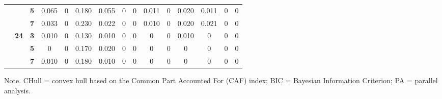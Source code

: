 \documentclass[a4paper,man,natbib]{apa6}
\begin{document}
\begin{table}[h]
\begin{center}
{\begin{tabular}{ccccccccccccccc}
		&
		&
		\textbf{5} &
		0.065 &
		0 &
		0.180 &
		0.055 &
		0 &
		0 &
		0.011 &
		0 &
		0.020 &
		0.011 &
		0 &
		0 \\ \cline{3-15} 
		&
		&
		\textbf{7} &
		0.033 &
		0 &
		0.230 &
		0.022 &
		0 &
		0 &
		0.010 &
		0 &
		0.020 &
		0.021 &
		0 &
		0 \\ \cline{2-15} 
		&
		\multirow{3}{*}{\textbf{24}} &
		\textbf{3} &
		0.010 &
		0 &
		0.130 &
		0.010 &
		0 &
		0 &
		0 &
		0 &
		0.010 &
		0 &
		0 &
		0 \\ \cline{3-15} 
		&
		&
		\textbf{5} &
		0 &
		0 &
		0.170 &
		0.020 &
		0 &
		0 &
		0 &
		0 &
		0 &
		0 &
		0 &
		0 \\ \cline{3-15} 
		&
		&
		\textbf{7} &
		0.010 &
		0 &
		0.180 &
		0.010 &
		0 &
		0 &
		0 &
		0 &
		0 &
		0 &
		0 &
		0 \\ \hline
	\end{tabular}%
}
	\end{center}
 \begin{tablenotes}[flushleft]
	\small
	\item 	Note. CHull = convex hull based on the Common Part Accounted For (CAF) index; BIC = Bayesian Information Criterion; PA = parallel analysis.
\end{tablenotes}
\end{table}
\end{document}
